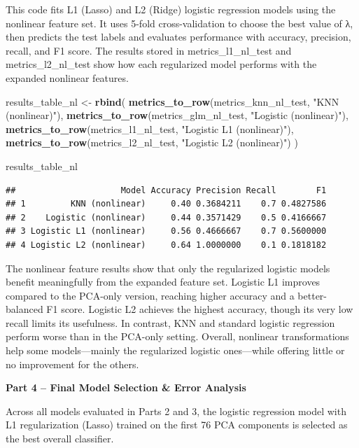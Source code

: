 \documentclass[
]{article}
\newenvironment{Shaded}{\begin{snugshade}}{\end{snugshade}}
\newcommand{\FunctionTok}[1]{\textcolor[rgb]{0.13,0.29,0.53}{\textbf{#1}}}
\newcommand{\NormalTok}[1]{#1}
\newcommand{\OtherTok}[1]{\textcolor[rgb]{0.56,0.35,0.01}{#1}}
\newcommand{\StringTok}[1]{\textcolor[rgb]{0.31,0.60,0.02}{#1}}
\begin{document}
This code fits L1 (Lasso) and L2 (Ridge) logistic regression models
using the nonlinear feature set. It uses 5-fold cross-validation to
choose the best value of λ, then predicts the test labels and evaluates
performance with accuracy, precision, recall, and F1 score. The results
stored in metrics\_l1\_nl\_test and metrics\_l2\_nl\_test show how each
regularized model performs with the expanded nonlinear features.

\begin{Shaded}
\begin{Highlighting}[]
\NormalTok{results\_table\_nl }\OtherTok{\textless{}{-}} \FunctionTok{rbind}\NormalTok{(}
  \FunctionTok{metrics\_to\_row}\NormalTok{(metrics\_knn\_nl\_test, }\StringTok{"KNN (nonlinear)"}\NormalTok{),}
  \FunctionTok{metrics\_to\_row}\NormalTok{(metrics\_glm\_nl\_test, }\StringTok{"Logistic (nonlinear)"}\NormalTok{),}
  \FunctionTok{metrics\_to\_row}\NormalTok{(metrics\_l1\_nl\_test,  }\StringTok{"Logistic L1 (nonlinear)"}\NormalTok{),}
  \FunctionTok{metrics\_to\_row}\NormalTok{(metrics\_l2\_nl\_test,  }\StringTok{"Logistic L2 (nonlinear)"}\NormalTok{)}
\NormalTok{)}

\NormalTok{results\_table\_nl}
\end{Highlighting}
\end{Shaded}

\begin{verbatim}
##                     Model Accuracy Precision Recall        F1
## 1         KNN (nonlinear)     0.40 0.3684211    0.7 0.4827586
## 2    Logistic (nonlinear)     0.44 0.3571429    0.5 0.4166667
## 3 Logistic L1 (nonlinear)     0.56 0.4666667    0.7 0.5600000
## 4 Logistic L2 (nonlinear)     0.64 1.0000000    0.1 0.1818182
\end{verbatim}

The nonlinear feature results show that only the regularized logistic
models benefit meaningfully from the expanded feature set. Logistic L1
improves compared to the PCA-only version, reaching higher accuracy and
a better-balanced F1 score. Logistic L2 achieves the highest accuracy,
though its very low recall limits its usefulness. In contrast, KNN and
standard logistic regression perform worse than in the PCA-only setting.
Overall, nonlinear transformations help some models---mainly the
regularized logistic ones---while offering little or no improvement for
the others.

\textbf{Part 4 -- Final Model Selection \& Error Analysis}

Across all models evaluated in Parts 2 and 3, the logistic regression
model with L1 regularization (Lasso) trained on the first 76 PCA
components is selected as the best overall classifier.
\end{document}
